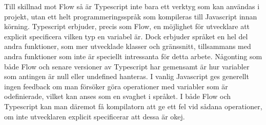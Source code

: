 Till skillnad mot Flow så är Typescript inte bara ett verktyg som kan användas i projekt, utan ett helt programmeringsspråk som kompileras till Javascript innan körning. Typescript erbjuder, precis som Flow, en möjlighet för utvecklare att explicit specificera vilken typ en variabel är. Dock erbjuder språket en hel del andra funktioner, som mer utvecklade klasser och gränssnitt, tillsammans med andra funktioner som inte är speciellt intressanta för detta arbete.
Någonting som både Flow och senare versioner av Typescript har gemensamt är hur variabler som antingen är null eller undefined hanteras. I vanlig Javascript ges generellt ingen feedback om man försöker göra operationer med variabler som är odefinierade, vilket kan anses som en svaghet i språket. I både Flow och Typescript kan man däremot få kompilatorn att ge ett fel vid sådana operationer, om inte utvecklaren explicit specificerar att dessa är okej.

